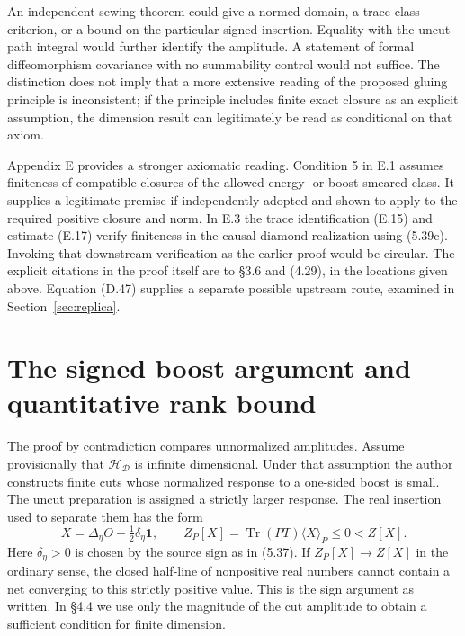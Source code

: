 \documentclass[11pt]{article}
\newcommand{\Tr}{\operatorname{Tr}}
\newcommand{\id}{\mathbf{1}}
\newcommand{\HH}{\mathcal H_{\mathcal D}}
\newcommand{\parttitle}[2]{\section{#1}}
\begin{document}
An independent sewing theorem could give a normed domain, a trace-class criterion, or a bound on the particular signed insertion. Equality with the uncut path integral would further identify the amplitude. A statement of formal diffeomorphism covariance with no summability control would not suffice. The distinction does not imply that a more extensive reading of the proposed gluing principle is inconsistent; if the principle includes finite exact closure as an explicit assumption, the dimension result can legitimately be read as conditional on that axiom.

Appendix E provides a stronger axiomatic reading. Condition 5 in E.1 assumes finiteness of compatible closures of the allowed energy- or boost-smeared class. It supplies a legitimate premise if independently adopted and shown to apply to the required positive closure and norm. In E.3 the trace identification (E.15) and estimate (E.17) verify finiteness in the causal-diamond realization using (5.39c). Invoking that downstream verification as the earlier proof would be circular. The explicit citations in the proof itself are to \S3.6 and (4.29), in the locations given above. Equation (D.47) supplies a separate possible upstream route, examined in Section~\ref{sec:replica}.

\parttitle{The signed boost argument and quantitative rank bound}{The signed boost argument}\label{sec:signed}
The proof by contradiction compares unnormalized amplitudes. Assume provisionally that $\HH$ is infinite dimensional. Under that assumption the author constructs finite cuts whose normalized response to a one-sided boost is small. The uncut preparation is assigned a strictly larger response. The real insertion used to separate them has the form
\begin{equation}\label{eq:signed}
 X=\Delta_\eta O-\tfrac12\delta_\eta\id,\qquad
 Z_P[X]=\Tr(PT)\langle X\rangle_P\le0<Z[X].
\end{equation}
Here $\delta_\eta>0$ is chosen by the source sign as in (5.37). If $Z_P[X]\to Z[X]$ in the ordinary sense, the closed half-line of nonpositive real numbers cannot contain a net converging to this strictly positive value. This is the sign argument as written. In \S4.4 we use only the magnitude of the cut amplitude to obtain a sufficient condition for finite dimension.
\end{document}
